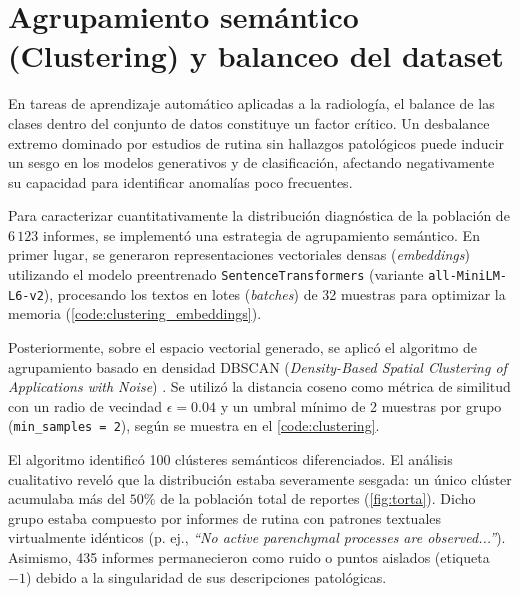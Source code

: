 \documentclass[../tesis.tex]{subfiles}
\begin{document}
\section{Agrupamiento semántico (Clustering) y balanceo del dataset}
\label{sec:clustering}

En tareas de aprendizaje automático aplicadas a la radiología, el balance de las clases dentro del conjunto de datos constituye un factor crítico. Un desbalance extremo dominado por estudios de rutina sin hallazgos patológicos puede inducir un sesgo en los modelos generativos y de clasificación, afectando negativamente su capacidad para identificar anomalías poco frecuentes.

Para caracterizar cuantitativamente la distribución diagnóstica de la población de $6\,123$ informes, se implementó una estrategia de agrupamiento semántico. En primer lugar, se generaron representaciones vectoriales densas (\textit{embeddings}) utilizando el modelo preentrenado \texttt{SentenceTransformers} (variante \texttt{all-MiniLM-L6-v2}), procesando los textos en lotes (\textit{batches}) de 32 muestras para optimizar la memoria (\autoref{code:clustering_embeddings}).



Posteriormente, sobre el espacio vectorial generado, se aplicó el algoritmo de agrupamiento basado en densidad DBSCAN (\textit{Density-Based Spatial Clustering of Applications with Noise}) \citep{3001460.3001507}. Se utilizó la distancia coseno como métrica de similitud con un radio de vecindad $\epsilon = 0.04$ y un umbral mínimo de 2 muestras por grupo (\texttt{min\_samples = 2}), según se muestra en el \autoref{code:clustering}.


El algoritmo identificó 100 clústeres semánticos diferenciados. El análisis cualitativo reveló que la distribución estaba severamente sesgada: un único clúster acumulaba más del $50\%$ de la población total de reportes (\autoref{fig:torta}). Dicho grupo estaba compuesto por informes de rutina con patrones textuales virtualmente idénticos (p. ej., \textit{``No active parenchymal processes are observed...''}). Asimismo, 435 informes permanecieron como ruido o puntos aislados (etiqueta $-1$) debido a la singularidad de sus descripciones patológicas.
\end{document}

